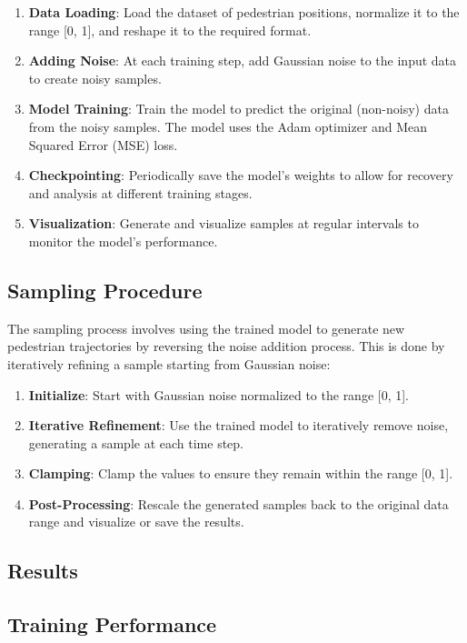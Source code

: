\documentclass[10pt,a4paper]{article}
\begin{document}
\begin{enumerate}
    \item \textbf{Data Loading}: Load the dataset of pedestrian positions, normalize it to the range [0, 1], and reshape it to the required format.
    \item \textbf{Adding Noise}: At each training step, add Gaussian noise to the input data to create noisy samples.
    \item \textbf{Model Training}: Train the model to predict the original (non-noisy) data from the noisy samples. The model uses the Adam optimizer and Mean Squared Error (MSE) loss.
    \item \textbf{Checkpointing}: Periodically save the model's weights to allow for recovery and analysis at different training stages.
    \item \textbf{Visualization}: Generate and visualize samples at regular intervals to monitor the model's performance.
\end{enumerate}
\subsection{Sampling Procedure}

The sampling process involves using the trained model to generate new pedestrian trajectories by reversing the noise addition process. This is done by iteratively refining a sample starting from Gaussian noise:

\begin{enumerate}
    \item \textbf{Initialize}: Start with Gaussian noise normalized to the range [0, 1].
    \item \textbf{Iterative Refinement}: Use the trained model to iteratively remove noise, generating a sample at each time step.
    \item \textbf{Clamping}: Clamp the values to ensure they remain within the range [0, 1].
    \item \textbf{Post-Processing}: Rescale the generated samples back to the original data range and visualize or save the results.
\end{enumerate}
\subsection{Results}

\subsection*{Training Performance}
\end{document}
